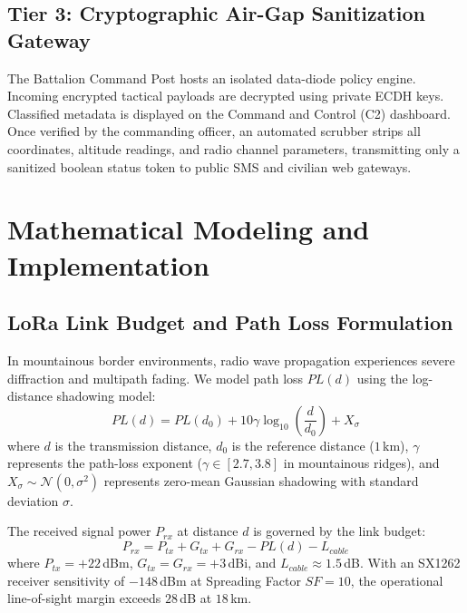 \documentclass[conference]{IEEEtran}
\begin{document}
\subsection{Tier 3: Cryptographic Air-Gap Sanitization Gateway}
The Battalion Command Post hosts an isolated data-diode policy engine. Incoming encrypted tactical payloads are decrypted using private ECDH keys. Classified metadata is displayed on the Command and Control (C2) dashboard. Once verified by the commanding officer, an automated scrubber strips all coordinates, altitude readings, and radio channel parameters, transmitting only a sanitized boolean status token to public SMS and civilian web gateways.

\section{Mathematical Modeling and Implementation}

\subsection{LoRa Link Budget and Path Loss Formulation}
In mountainous border environments, radio wave propagation experiences severe diffraction and multipath fading. We model path loss $PL(d)$ using the log-distance shadowing model:
\begin{equation}
PL(d) = PL(d_0) + 10 \gamma \log_{10}\left(\frac{d}{d_0}\right) + X_\sigma
\label{eq:pathloss}
\end{equation}
where $d$ is the transmission distance, $d_0$ is the reference distance ($1$\,km), $\gamma$ represents the path-loss exponent ($\gamma \in [2.7, 3.8]$ in mountainous ridges), and $X_\sigma \sim \mathcal{N}(0, \sigma^2)$ represents zero-mean Gaussian shadowing with standard deviation $\sigma$.

The received signal power $P_{rx}$ at distance $d$ is governed by the link budget:
\begin{equation}
P_{rx} = P_{tx} + G_{tx} + G_{rx} - PL(d) - L_{cable}
\label{eq:rx_power}
\end{equation}
where $P_{tx} = +22$\,dBm, $G_{tx} = G_{rx} = +3$\,dBi, and $L_{cable} \approx 1.5$\,dB. With an SX1262 receiver sensitivity of $-148$\,dBm at Spreading Factor $SF = 10$, the operational line-of-sight margin exceeds $28$\,dB at $18$\,km.
\end{document}
